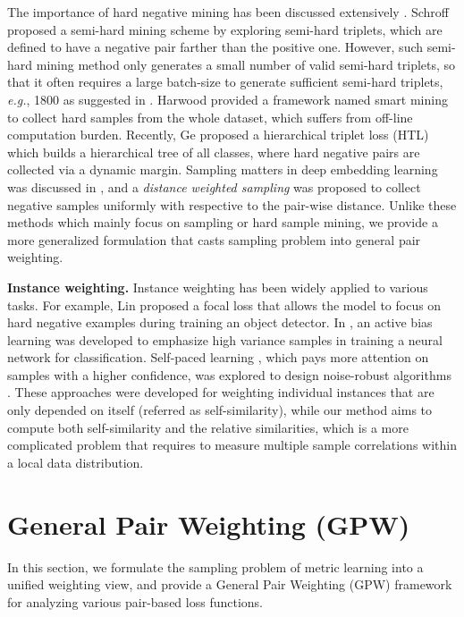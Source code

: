 \documentclass[10pt,twocolumn,letterpaper]{article}
\begin{document}
The importance of hard negative mining has been discussed extensively \cite{semi-hard, smart-mining, sampling, HTL}. Schroff \etal \cite{semi-hard} proposed a semi-hard mining scheme by exploring semi-hard triplets, which are defined to have a negative pair farther than the positive one. However, such semi-hard mining method only generates a small number of valid semi-hard triplets, so that it often requires a large batch-size to generate sufficient semi-hard triplets, {\it e.g.}, 1800 as suggested in \cite{semi-hard}.
Harwood \etal \cite{smart-mining} provided a framework named smart mining to collect hard samples from the whole dataset, which suffers from off-line computation burden. Recently, Ge \etal \cite{HTL} proposed a hierarchical triplet loss (HTL) which builds a hierarchical tree of all classes, where hard negative pairs are collected via a dynamic margin.
Sampling matters in deep embedding learning was discussed in \cite{sampling}, and a {\it distance weighted sampling} was proposed to collect negative samples uniformly with respective to the pair-wise distance.
Unlike these methods which mainly focus on sampling or hard sample mining, we provide a more generalized formulation that casts sampling problem into general pair weighting.

{\textbf{Instance weighting.}} Instance weighting has been widely applied to various tasks. For example, Lin \etal \cite{focal_loss} proposed a focal loss that allows the model to focus on hard negative examples during training an object detector.
In \cite{chang2017active}, an active bias learning was developed to emphasize high variance samples in training a neural network for classification.
Self-paced learning \cite{kumar2010self}, which pays more attention on samples with a higher confidence, was explored to design noise-robust algorithms \cite{NIPS2014_5568}. These approaches \cite{focal_loss,jiang2018mentornet,chang2017active,kumar2010self} were developed for weighting individual instances that are only depended on itself (referred as self-similarity), while our method aims to compute both self-similarity and the relative similarities, 
which is a more complicated problem that requires to measure multiple sample correlations within a local data distribution.

\section{General Pair Weighting (GPW)}
\label{section-weighting}
In this section, we formulate the sampling problem of metric learning into a unified weighting view, and provide a General Pair Weighting (GPW) framework for analyzing various pair-based loss functions. 
\end{document}
